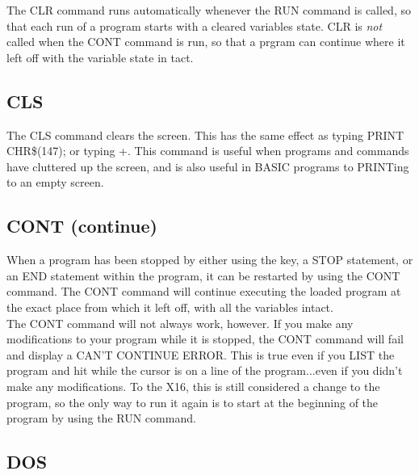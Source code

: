The {\ttfamily CLR} command runs automatically whenever the {\ttfamily RUN}
command is called, so that each run of a program starts with a cleared
variables state.  {\ttfamily CLR} is \emph{not} called when the {\ttfamily
CONT} command is run, so that a prgram can continue where it left off with the
variable state in tact.\\

\subsection{CLS}

The {\ttfamily CLS} command clears the screen. This has the same effect as
typing {\ttfamily PRINT CHR\$(147);} or typing
+.
This command is useful when programs and commands have cluttered up the screen,
and is also useful in BASIC programs to {\ttfamily PRINT}ing to an empty
screen.\\

\subsection{CONT (continue)}

When a program has been stopped by either using the
 key, a {\ttfamily STOP}
statement, or an {\ttfamily END} statement within the program, it can be
restarted by using the {\ttfamily CONT} command.  The {\ttfamily CONT} command
will continue executing the loaded program at the exact place from which it
left off, with all the variables intact.\\

The {\ttfamily CONT} command will not always work, however.  If you make any
modifications to your program while it is stopped, the {\ttfamily CONT} command
will fail and display a {\ttfamily CAN'T CONTINUE ERROR}.  This is true even if
you {\ttfamily LIST} the program and hit  while the cursor is
on a line of the program...even if you didn't make any modifications.  To the
X16, this is still considered a change to the program, so the only way to run
it again is to start at the beginning of the program by using the {\ttfamily
RUN} command.\\

\subsection{DOS}

